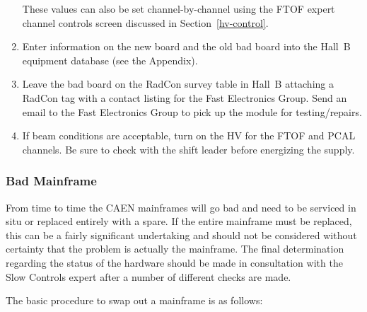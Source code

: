 \documentclass[12pt]{article}
\begin{document}
\begin{enumerate}
These values can also be set channel-by-channel using the FTOF expert channel controls
screen discussed in Section~\ref{hv-control}.
\item Enter information on the new board and the old bad board into the Hall~B equipment 
database (see the Appendix).
\item Leave the bad board on the RadCon survey table in Hall~B attaching a RadCon tag with a
contact listing for the Fast Electronics Group. Send an email to the Fast Electronics Group
to pick up the module for testing/repairs.
\item If beam conditions are acceptable, turn on the HV for the FTOF and PCAL channels. 
Be sure to check with the shift leader before energizing the supply.
\end{enumerate}

\subsubsection{Bad Mainframe}
\label{mainframe}

From time to time the CAEN mainframes will go bad and need to be serviced in situ or
replaced entirely with a spare. If the entire mainframe must be replaced, this can be
a fairly significant undertaking and should not be considered without certainty that 
the problem is actually the mainframe. The final determination regarding the status of 
the hardware should be made in consultation with the Slow Controls expert after a 
number of different checks are made.

The basic procedure to swap out a mainframe is as follows:
\end{document}
